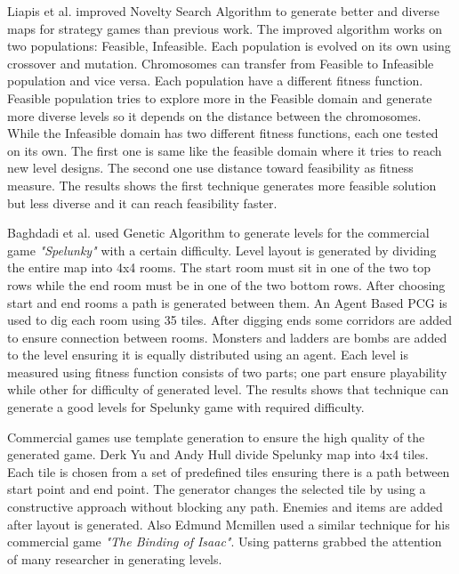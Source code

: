Liapis et al.\cite{noveltySearch} improved Novelty Search Algorithm to generate better and diverse maps for strategy games than previous work\cite{goodDiverseLevels}. The improved algorithm works on two populations: Feasible, Infeasible. Each population is evolved on its own using crossover and mutation. Chromosomes can transfer from Feasible to Infeasible population and vice versa. Each population have a different fitness function. Feasible population tries to explore more in the Feasible domain and generate more diverse levels so it depends on the distance between the chromosomes. While the Infeasible domain has two different fitness functions, each one tested on its own. The first one is same like the feasible domain where it tries to reach new level designs. The second one use distance toward feasibility as fitness measure. The results shows the first technique generates more feasible solution but less diverse and it can reach feasibility faster.\\\par

Baghdadi et al.\cite{spelunkyLevelGeneration} used Genetic Algorithm to generate levels for the commercial game \emph{"Spelunky"}\cite{spelunky} with a certain difficulty. Level layout is generated by dividing the entire map into 4x4 rooms. The start room must sit in one of the two top rows while the end room must be in one of the two bottom rows. After choosing start and end rooms a path is generated between them. An Agent Based PCG is used to dig each room using 35 tiles. After digging ends some corridors are added to ensure connection between rooms. Monsters and ladders are bombs are added to the level ensuring it is equally distributed using an agent. Each level is measured using fitness function consists of two parts; one part ensure playability while other for difficulty of generated level. The results shows that technique can generate a good levels for Spelunky game with required difficulty.\\\par

Commercial games use template generation to ensure the high quality of the generated game. Derk Yu and Andy Hull\cite{spelunkyTechnique} divide Spelunky map into 4x4 tiles. Each tile is chosen from a set of predefined tiles ensuring there is a path between start point and end point. The generator changes the selected tile by using a constructive approach without blocking any path. Enemies and items are added after layout is generated. Also Edmund Mcmillen\cite{theBindingOfIsaacTechnique} used a similar technique for his commercial game \emph{"The Binding of Isaac"}. Using patterns grabbed the attention of many researcher in generating levels.\\\par

